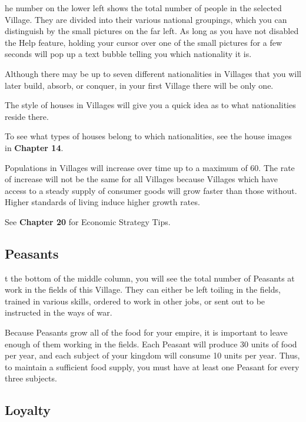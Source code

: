 he number on the lower left shows the total number of people in the selected Village. They are divided into their various national groupings, which you can distinguish by the small pictures on the far left. As long as you have not disabled the Help feature, holding your cursor over one of the small pictures for a few seconds will pop up a text bubble telling you which nationality it is.

Although there may be up to seven different nationalities in Villages that you will later build, absorb, or conquer, in your first Village there will be only one.

The style of houses in Villages will give you a quick idea as to what nationalities reside there.

To see what types of houses belong to which nationalities, see the house images in \textbf{Chapter 14}.

Populations in Villages will increase over time up to a maximum of 60. The rate of increase will not be the same for all Villages because Villages which have access to a steady supply of consumer goods will grow faster than those without. Higher standards of living induce higher growth rates.

See \textbf{Chapter 20} for Economic Strategy Tips.

\subsection{\textsf{Peasants}}


t the bottom of the middle column, you will see the total number of Peasants at work in the fields of this Village. They can either be left toiling in the fields, trained in various skills, ordered to work in other jobs, or sent out to be instructed in the ways of war.

Because Peasants grow all of the food for your empire, it is important to leave enough of them working in the fields. Each Peasant will produce 30 units of food per year, and each subject of your kingdom will consume 10 units per year. Thus, to maintain a sufficient food supply, you must have at least one Peasant for every three subjects.

\subsection{\textsf{Loyalty}}



